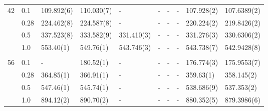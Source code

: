 {\begin{landscape}
\begin{table}
\begin{tabularx}{\hsize}{l:l|R{2.3cm}R{2.3cm}R{2.3cm}R{2.3cm}R{2.3cm}R{2.3cm}R{2.3cm}R{2.3cm}}
		42 & 0.1 & 109.892(6) & 110.030(7) & - & - & - & - &  107.928(2) & 107.6389(2) \\ 
		& 0.28 & 224.462(8) & 224.587(8) & - & - & - & - & 220.224(2) & 219.8426(2) \\
		& 0.5 & 337.523(8) & 333.582(9) & 331.410(3) & - & - & - & 331.276(3) & 330.6306(2) \\
		& 1.0 & 553.40(1) & 549.76(1) & 543.746(3) & - & - & - & 543.738(7) & 542.9428(8) \\ \hdashline \\
		
		56 & 0.1 & - & 180.52(1) & - & - & - & - & 176.774(3) & 175.9553(7) \\ 
		& 0.28 & 364.85(1) & 366.91(1) & - & - & - & - & 359.63(1) & 358.145(2) \\
		& 0.5 & 547.46(1) & 545.74(1) & - & - & - & - & 538.686(9) & 537.353(2) \\
		& 1.0 & 894.12(2) & 890.70(2) & - & - & - & - & 880.352(5) & 879.3986(6) \\ \hline\hline
	\end{tabularx}
\end{table}


\end{landscape}}
